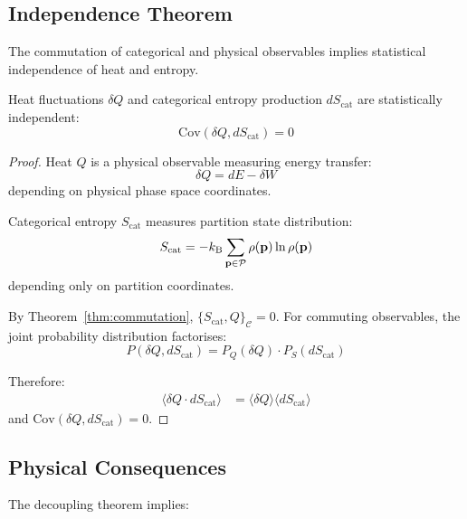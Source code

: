 \subsection{Independence Theorem}

The commutation of categorical and physical observables implies statistical independence of heat and entropy.

\begin{theorem}
\label{thm:decoupling}
Heat fluctuations $\delta Q$ and categorical entropy production $dS_{\mathrm{cat}}$ are statistically independent:
\begin{equation}
    \mathrm{Cov}(\delta Q, dS_{\mathrm{cat}}) = 0
\end{equation}
\end{theorem}

\begin{proof}
Heat $Q$ is a physical observable measuring energy transfer:
\begin{equation}
    \delta Q = dE - \delta W
\end{equation}
depending on physical phase space coordinates.

Categorical entropy $S_{\mathrm{cat}}$ measures partition state distribution:
\begin{equation}
    S_{\mathrm{cat}} = -k_{\mathrm{B}} \sum_{\mathbf{p} \in \mathcal{P}} \rho(\mathbf{p}) \ln \rho(\mathbf{p})
\end{equation}
depending only on partition coordinates.

By Theorem~\ref{thm:commutation}, $\{S_{\mathrm{cat}}, Q\}_{\mathcal{C}} = 0$. For commuting observables, the joint probability distribution factorises:
\begin{equation}
    P(\delta Q, dS_{\mathrm{cat}}) = P_Q(\delta Q) \cdot P_S(dS_{\mathrm{cat}})
\end{equation}

Therefore:
\begin{align}
    \langle \delta Q \cdot dS_{\mathrm{cat}} \rangle &= \langle \delta Q \rangle \langle dS_{\mathrm{cat}} \rangle
\end{align}
and $\mathrm{Cov}(\delta Q, dS_{\mathrm{cat}}) = 0$.
\end{proof}

\subsection{Physical Consequences}

The decoupling theorem implies:

